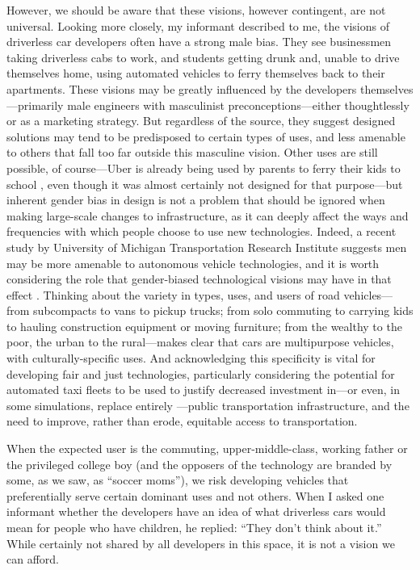 However, we should be aware that these visions, however contingent,
are not universal. Looking more closely, my informant described to me, the visions
of driverless car developers
often have a strong male bias. They see businessmen
taking driverless cabs to work, and students getting drunk and, unable
to drive themselves home, using automated vehicles to ferry themselves
back to their apartments. These visions may be greatly influenced by
the developers themselves---primarily male engineers with masculinist
preconceptions---either thoughtlessly or as a marketing strategy. But
regardless of the source, they suggest designed solutions may tend to
be predisposed to certain types of uses, and less amenable to others
that fall too far outside this masculine vision. Other uses are still
possible, of course---Uber is already being used by parents to ferry
their kids to school \cite{hoderParents} \cite{shapiroVan}, even
though it was almost certainly not designed 
for that
purpose---but inherent gender bias in design is not a problem that should be ignored
when making large-scale changes to infrastructure, as it can deeply
affect the ways and frequencies with which people choose to use new
technologies. Indeed, a recent study by University of Michigan
Transportation Research Institute suggests men may be more
amenable to autonomous vehicle technologies, and it is worth
considering the role that gender-biased technological visions may have
in that
effect \cite{miglioreWomen}.
Thinking about the variety in types, uses, and users of road vehicles---from
subcompacts to vans to pickup trucks; from solo commuting to carrying kids to
hauling construction equipment or moving furniture; from the wealthy
to the poor, the urban to the rural---makes clear that cars are
multipurpose vehicles, with culturally-specific uses. And
acknowledging this
specificity is vital for developing fair and just technologies,
particularly
considering the potential for automated taxi fleets to 
be used to justify decreased investment in---or even, in some
simulations, replace entirely
\cite{frazzoliSingapore}---public transportation infrastructure, and the need to
improve, rather than erode, equitable access to transportation.


When the
expected user is the commuting, upper-middle-class, working father or
the privileged college boy (and the opposers of the technology are
branded by some, as we saw, as ``soccer moms''), we risk developing
vehicles that preferentially serve certain dominant uses and not
others. When I asked one informant whether the developers have an idea
of what driverless cars would mean for people who have children, he
replied:  ``They don't think about it.'' While certainly not shared by
all developers in this space, it is not a vision we can afford.

